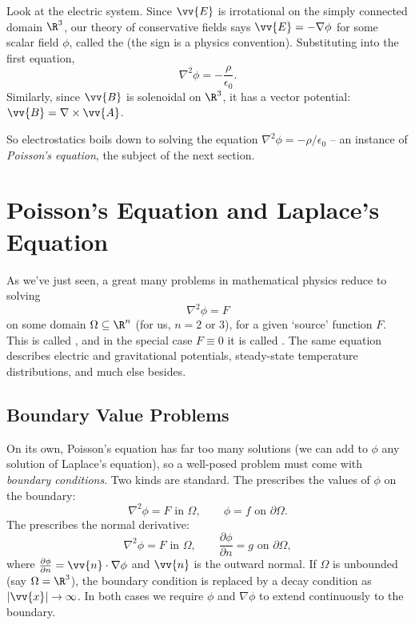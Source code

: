 Look at the electric system. Since $\vv{E}$ is irrotational on the simply connected domain $\R^3$, our theory of conservative fields says $\vv{E} = -\nabla \phi$ for some scalar field $\phi$, called the  (the sign is a physics convention). Substituting into the first equation,
$$
\nabla^2 \phi = -\frac{\rho}{\epsilon_0}.
$$
Similarly, since $\vv{B}$ is solenoidal on $\R^3$, it has a vector potential: $\vv{B} = \nabla \times \vv{A}$.

So electrostatics boils down to solving the equation $\nabla^2 \phi = -\rho/\epsilon_0$ -- an instance of \emph{Poisson's equation}, the subject of the next section.

\section{Poisson's Equation and Laplace's Equation}

As we've just seen, a great many problems in mathematical physics reduce to solving
$$
\nabla^2 \phi = F
$$
on some domain $\Omega \subseteq \R^n$ (for us, $n = 2$ or $3$), for a given `source' function $F$. This is called , and in the special case $F \equiv 0$ it is called . The same equation describes electric and gravitational potentials, steady-state temperature distributions, and much else besides.

\subsection{Boundary Value Problems}

On its own, Poisson's equation has far too many solutions (we can add to $\phi$ any solution of Laplace's equation), so a well-posed problem must come with \emph{boundary conditions}. Two kinds are standard. The  prescribes the values of $\phi$ on the boundary:
$$
\nabla^2 \phi = F \text{ in } \Omega, \quad \quad \phi = f \text{ on } \partial \Omega.
$$
The  prescribes the normal derivative:
$$
\nabla^2 \phi = F \text{ in } \Omega, \quad \quad \frac{\partial \phi}{\partial n} = g \text{ on } \partial \Omega,
$$
where $\frac{\partial \phi}{\partial n} = \vv{n} \cdot \nabla \phi$ and $\vv{n}$ is the outward normal. If $\Omega$ is unbounded (say $\Omega = \R^3$), the boundary condition is replaced by a decay condition as $|\vv{x}| \to \infty$. In both cases we require $\phi$ and $\nabla \phi$ to extend continuously to the boundary.

